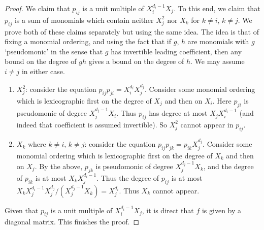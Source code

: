 \begin{proof}
We claim that $p_{ij}$ is a unit multiple of $X_i^{d_i-1} X_j$. 
To this end, we claim that $p_{ij}$ is a sum of monomials which contain neither
$X_j^2$ nor $X_k$ for $k \ne i$, $k \ne j$. 
We prove both of these claims separately but using the same idea. The idea is that of
fixing a monomial ordering, and using the fact that if $g$, $h$ are monomials with $g$ `pseudomonic'
in the sense that $g$ has invertible leading coefficient,
then any bound on the degree of $gh$ gives a bound on the degree of $h$.
We may assume $i \ne j$ in either case.
\begin{enumerate}
\item $X_j^2$: consider the equation $p_{ij}p_{ji} = X_i^{d_i} X_j^{d_j}$. Consider some
monomial ordering which is lexicographic first on the degree of $X_j$ and then on $X_i$.
Here $p_{ji}$ is pseudomonic of degree $X_j^{d_j-1}X_i$.
Thus $p_{ij}$ has degree at most $X_j X_i^{d_i-1}$ 
(and indeed that coefficient is assumed invertible). So $X_j^2$ cannot appear in $p_{ij}$.
\item $X_k$ where $k \ne i$, $k \ne j$: consider the equation $p_{ij} p_{jk} = p_{ik} X_j^{d_j}$.
Consider some monomial ordering which is lexicographic first on the degree of $X_k$
and then on $X_j$. By the above, $p_{jk}$ is pseudomonic of degree $X_j^{d_j-1} X_k$,
and the degree of $p_{ik}$ is at most $X_k X_j^{d_i-1}$.
Thus the degree of $p_{ij}$ is at most $X_k X_j^{d_i-1} X_j^{d_j} / (X_j^{d_j-1}X_k) = X_j^{d_i}$.
Thus $X_k$ cannot appear.
\end{enumerate}

Given that $p_{ij}$ is a unit multiple of $X_i^{d_i-1} X_j$, it is direct that
$f$ is given by a diagonal matrix. This finishes the proof.
\end{proof}
